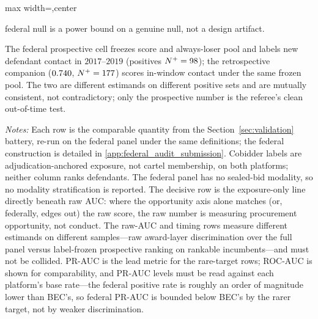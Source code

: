 \begin{table}[htbp]
\begin{adjustbox}{max width=\textwidth,center}
\begin{threeparttable}
\begin{tablenotes}
federal null is a power bound on a genuine null, not a design
artifact.
\item[b] The federal prospective cell freezes score and always-loser
pool and labels new defendant contact in $2017$--$2019$
(positives $N^{+}=98$); the retrospective companion
($0.740$, $N^{+}=177$) scores in-window contact under the
same frozen pool. The two are different estimands on different
positive sets and are mutually consistent, not contradictory; only
the prospective number is the referee's clean out-of-time test.
\item \textit{Notes:} Each row is the comparable quantity from the
Section~\ref{sec:validation} battery, re-run on the federal panel
under the same definitions; the federal construction is detailed in
\ref{app:federal_audit_submission}. Cobidder labels are
adjudication-anchored exposure, not cartel membership, on both
platforms; neither column ranks defendants. The federal panel has no
sealed-bid modality, so no modality stratification is reported.
The decisive row is the exposure-only line directly beneath raw
AUC: where the opportunity axis alone matches (or, federally,
edges out) the raw score, the raw number is measuring procurement
opportunity, not conduct. The raw-AUC and timing rows measure
different estimands on different samples---raw award-layer
discrimination over the full panel versus label-frozen prospective
ranking on rankable incumbents---and must not be collided. PR-AUC is
the lead metric for the rare-target rows; ROC-AUC is shown for
comparability, and PR-AUC levels must be read against each platform's
base rate---the federal positive rate is roughly an order of
magnitude lower than BEC's, so federal PR-AUC is bounded below BEC's
by the rarer target, not by weaker discrimination.
\end{tablenotes}
\end{threeparttable}
\end{adjustbox}
\end{table}

